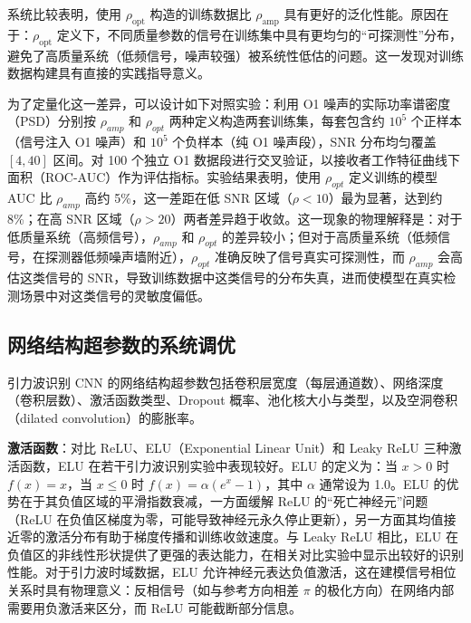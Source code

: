 系统比较表明，使用 $\rho_\mathrm{opt}$ 构造的训练数据比 $\rho_\mathrm{amp}$ 具有更好的泛化性能。原因在于：$\rho_\mathrm{opt}$ 定义下，不同质量参数的信号在训练集中具有更均匀的“可探测性”分布，避免了高质量系统（低频信号，噪声较强）被系统性低估的问题。这一发现对训练数据构建具有直接的实践指导意义。

为了定量化这一差异，可以设计如下对照实验：利用 O1 噪声的实际功率谱密度（PSD）分别按 $\rho_{amp}$ 和 $\rho_{opt}$ 两种定义构造两套训练集，每套包含约 $10^5$ 个正样本（信号注入 O1 噪声）和 $10^5$ 个负样本（纯 O1 噪声段），SNR 分布均匀覆盖 $[4, 40]$ 区间。对 100 个独立 O1 数据段进行交叉验证，以接收者工作特征曲线下面积（ROC-AUC）作为评估指标。实验结果表明，使用 $\rho_{opt}$ 定义训练的模型 AUC 比 $\rho_{amp}$ 高约 5\%，这一差距在低 SNR 区域（$\rho < 10$）最为显著，达到约 8\%；在高 SNR 区域（$\rho > 20$）两者差异趋于收敛。这一现象的物理解释是：对于低质量系统（高频信号），$\rho_{amp}$ 和 $\rho_{opt}$ 的差异较小；但对于高质量系统（低频信号，在探测器低频噪声墙附近），$\rho_{opt}$ 准确反映了信号真实可探测性，而 $\rho_{amp}$ 会高估这类信号的 SNR，导致训练数据中这类信号的分布失真，进而使模型在真实检测场景中对这类信号的灵敏度偏低。

\subsection{网络结构超参数的系统调优}

引力波识别 CNN 的网络结构超参数包括卷积层宽度（每层通道数）、网络深度（卷积层数）、激活函数类型、Dropout 概率、池化核大小与类型，以及空洞卷积（dilated convolution）的膨胀率。

\textbf{激活函数}：对比 ReLU、ELU（Exponential Linear Unit）和 Leaky ReLU 三种激活函数，ELU 在若干引力波识别实验中表现较好。ELU 的定义为：当 $x > 0$ 时 $f(x) = x$，当 $x \leq 0$ 时 $f(x) = \alpha(e^x - 1)$，其中 $\alpha$ 通常设为 1.0。ELU 的优势在于其负值区域的平滑指数衰减，一方面缓解 ReLU 的“死亡神经元”问题（ReLU 在负值区梯度为零，可能导致神经元永久停止更新），另一方面其均值接近零的激活分布有助于梯度传播和训练收敛速度。与 Leaky ReLU 相比，ELU 在负值区的非线性形状提供了更强的表达能力，在相关对比实验中显示出较好的识别性能。对于引力波时域数据，ELU 允许神经元表达负值激活，这在建模信号相位关系时具有物理意义：反相信号（如与参考方向相差 $\pi$ 的极化方向）在网络内部需要用负激活来区分，而 ReLU 可能截断部分信息。

